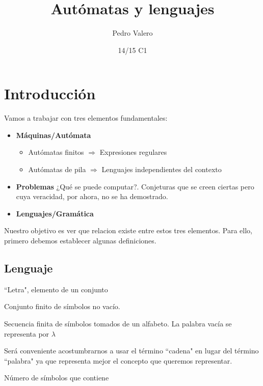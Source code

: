 \documentclass{apuntes}
\title{Autómatas y lenguajes}
\author{Pedro Valero}
\date{14/15 C1}
\begin{document}
\pagestyle{plain}
\maketitle

\tableofcontents
\newpage

\printindex

\chapter{Introducción}
Vamos a trabajar con tres elementos fundamentales:
\begin{itemize}
\item \textbf{Máquinas/Autómata}
\begin{itemize}
\item Autómatas finitos $\Rightarrow$ Expresiones regulares
\item Autómatas de pila $\Rightarrow$ Lenguajes independientes del contexto
\end{itemize}
\item \textbf{Problemas} ¿Qué se puede computar?. Conjeturas que se creen ciertas pero cuya veracidad, por ahora, no se ha demostrado.

\item \textbf{Lenguajes/Gramática}
\end{itemize}

Nuestro objetivo es ver que relacion existe entre estos tres elementos. Para ello, primero debemos establecer algunas definiciones.

\section{Lenguaje}
\begin{defn}[Símbolo]
``Letra", elemento de un conjunto
\end{defn}

\begin{defn}[Alfabeto]
Conjunto finito de símbolos no vacío.
\end{defn}

\begin{defn}
Secuencia finita de símbolos tomados de un alfabeto.
La palabra vacía se representa por $\lambda$
\end{defn}
Será conveniente acostumbrarnos a usar el término ``cadena" en lugar del término ``palabra" ya que representa mejor el concepto que queremos representar.


\begin{defn}
Número de símbolos que contiene
\end{defn}
\end{document}
